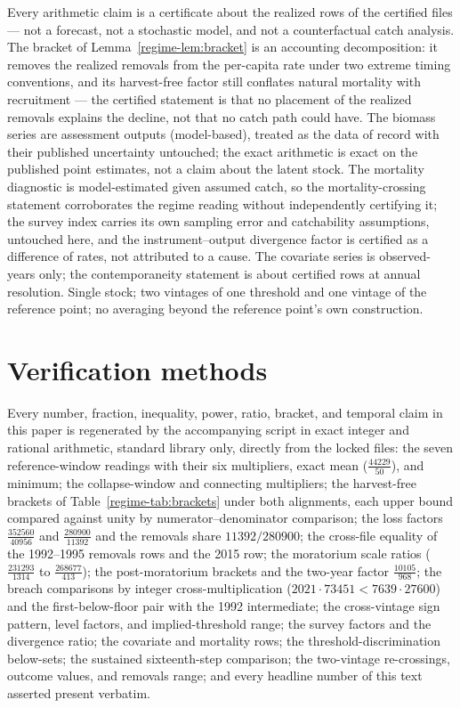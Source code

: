 Every arithmetic claim is a certificate about the realized rows of the
certified files --- not a forecast, not a stochastic model, and not a
counterfactual catch analysis. The bracket of
Lemma~\ref{regime-lem:bracket} is an accounting decomposition: it removes the
realized removals from the per-capita rate under two extreme timing
conventions, and its harvest-free factor still conflates natural
mortality with recruitment --- the certified statement is that no
placement of the realized removals explains the decline, not that no
catch path could have. The biomass series are assessment outputs
(model-based), treated as the data of record with their published
uncertainty untouched; the exact arithmetic is exact on the published
point estimates, not a claim about the latent stock. The mortality
diagnostic is model-estimated given assumed catch, so the
mortality-crossing statement corroborates the regime reading without
independently certifying it; the survey index carries its own sampling
error and catchability assumptions, untouched here, and the
instrument--output divergence factor is certified as a difference of
rates, not attributed to a cause. The covariate series is
observed-years only; the contemporaneity statement is about certified
rows at annual resolution. Single stock; two vintages of one threshold
and one vintage of the reference point; no averaging beyond the
reference point's own construction.

\section{Verification methods}\label{regime-methods}

Every number, fraction, inequality, power, ratio, bracket, and
temporal claim in this paper is regenerated by the accompanying script
in exact integer and rational arithmetic, standard library only,
directly from the locked files: the seven reference-window readings
with their six multipliers, exact mean
(\(\tfrac{44229}{50}\)), and minimum; the collapse-window and
connecting multipliers; the harvest-free brackets of
Table~\ref{regime-tab:brackets} under both alignments, each upper bound
compared against unity by numerator--denominator comparison; the loss
factors \(\tfrac{352560}{40956}\) and \(\tfrac{280900}{11392}\) and
the removals share \(11392/280900\); the cross-file equality of the
1992--1995 removals rows and the 2015 row; the moratorium scale ratios
(\(\tfrac{231293}{1314}\) to \(\tfrac{268677}{413}\)); the
post-moratorium brackets and the two-year factor
\(\tfrac{10105}{968}\); the breach comparisons by integer
cross-multiplication (\(2021 \cdot 73451 < 7639 \cdot 27600\)) and the
first-below-floor pair with the 1992 intermediate; the cross-vintage
sign pattern, level factors, and implied-threshold range; the survey
factors and the divergence ratio; the covariate and mortality rows;
the threshold-discrimination below-sets; the sustained sixteenth-step
comparison; the two-vintage re-crossings, outcome values, and removals
range; and every headline number of this text asserted present
verbatim.

